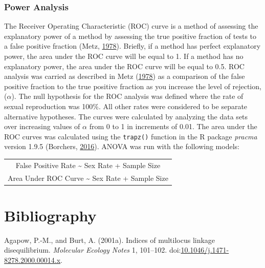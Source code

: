 \documentclass[double,12pt]{beavtex}
\begin{document}
  \subsection{Power Analysis}\label{power-analysis}
  
  The Receiver Operating Characteristic (ROC) curve is a method of
  assessing the explanatory power of a method by assessing the true
  positive fraction of tests to a false positive fraction (Metz,
  \protect\hyperlink{ref-metz1978basic}{1978}). Briefly, if a method has
  perfect explanatory power, the area under the ROC curve will be equal to
  1. If a method has no explanatory power, the area under the ROC curve
  will be equal to 0.5. ROC analysis was carried as described in Metz
  (\protect\hyperlink{ref-metz1978basic}{1978}) as a comparison of the
  false positive fraction to the true positive fraction as you increase
  the level of rejection, (\(\alpha\)). The null hypothesis for the ROC
  analysis was defined where the rate of sexual reproduction was 100\%.
  All other rates were considered to be separate alternative hypotheses.
  The curves were calculated by analyzing the data sets over increasing
  values of \(\alpha\) from 0 to 1 in increments of 0.01. The area under
  the ROC curves was calculated using the \texttt{trapz()} function in the
  R package \emph{pracma} version 1.9.5 (Borchers,
  \protect\hyperlink{ref-borchers2016pracma}{2016}). ANOVA was run with
  the following models:
  
  \begin{longtable}[]{@{}c@{}}
  \toprule
  False Positive Rate \textasciitilde{} Sex Rate + Sample
  Size\tabularnewline
  Area Under ROC Curve \textasciitilde{} Sex Rate + Sample
  Size\tabularnewline
  \bottomrule
  \end{longtable}
  
  \backmatter
  
  \chapter{Bibliography}\label{bibliography}
  
  \noindent
  
  \setlength{\parindent}{-0.20in} \setlength{\leftskip}{0.20in}
  \setlength{\parskip}{8pt} \singlespacing
  
  \hypertarget{refs}{}
  \hypertarget{ref-Agapow_2001}{}
  Agapow, P.-M., and Burt, A. (2001a). Indices of multilocus linkage
  disequilibrium. \emph{Molecular Ecology Notes} 1, 101--102.
  doi:\href{https://doi.org/10.1046/j.1471-8278.2000.00014.x}{10.1046/j.1471-8278.2000.00014.x}.
  
\end{document}
